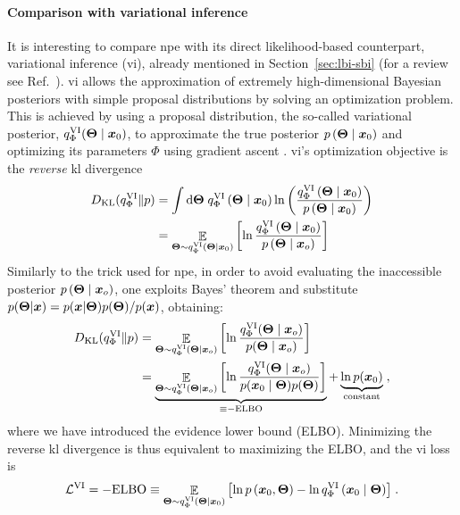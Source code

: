 \paragraph{Comparison with variational inference} 
It is interesting to compare \gls*{npe} with its direct likelihood-based counterpart, variational inference (\gls*{vi}), already mentioned in Section~\ref{sec:lbi-sbi} (for a review see Ref.~\cite{zhang2018advances}). \Gls*{vi} allows the approximation of extremely high-dimensional Bayesian posteriors with simple proposal distributions by solving an optimization problem. 
This is achieved by using a proposal distribution, the so-called variational posterior, $q^\text{VI}_\Phi(\bm{\Theta} \mid \bm{x}_0)$, to approximate the true posterior $p\left(\bm{\Theta} \mid \bm{x}_0\right)$ and optimizing its parameters $\Phi$ using gradient ascent \cite{Murphy:book, bottou:nips, kingma2014adam}. \Gls*{vi}'s optimization objective is the \emph{reverse} \gls*{kl} divergence
%
\begin{align} \label{eq:rkl}
	D_{\mathrm{KL}}(q^\text{VI}_\Phi \| p)  &= \int \dd \bm{\Theta}\; q^\text{VI}_\Phi\left(\bm{\Theta} \mid \bm{x}_0 \right) \ln \left(\frac{q^\text{VI}_\Phi\left(\bm{\Theta} \mid \bm{x}_0\right)}{p\left(\bm{\Theta} \mid \bm{x}_0\right)}\right) \\
	& =\mathop{\mathbb{E}}\limits_{\bm{\Theta} \sim q^\text{VI}_\Phi\left(\bm{\Theta} \mid \bm{x}_0\right)}\left[\ln \frac{q^\text{VI}_\Phi\left(\bm{\Theta} \mid \bm{x}_0\right)}{p\left(\bm{\Theta} \mid \bm{x}_o\right)}\right]
\end{align}
%
Similarly to the trick used for \gls*{npe}, in order to avoid evaluating the inaccessible posterior $p\left(\bm{\Theta} \mid \bm{x}_o\right)$, one exploits Bayes' theorem and substitute $p(\bm{\Theta}| \bm{x}) = p(\bm{x}| \bm{\Theta}) p(\bm{\Theta}) / p(\bm{x})$, obtaining:
%
\begin{align}
	D_{\mathrm{KL}}(q^\text{VI}_\Phi \| p) &=
	\mathop{\mathbb{E}}\limits_{\bm{\Theta} \sim q^\text{VI}_\Phi(\bm{\Theta} \mid \bm{x}_o)}\left[\ln \frac{q^\text{VI}_\Phi(\bm{\Theta} \mid \bm{x}_o)}{p(\bm{\Theta} \mid \bm{x}_o)}\right] \\
	& =\underbrace{\mathop{\mathbb{E}}\limits_{\bm{\Theta} \sim q^\text{VI}_\Phi(\bm{\Theta}\mid \bm{x}_o)}\left[\ln \frac{q^\text{VI}_\Phi(\bm{\Theta} \mid \bm{x}_o)}{p(\bm{x}_0 \mid \bm{\Theta}) p(\bm{\Theta})}\right]}_{\equiv-{\rm ELBO}}+ \underbrace{\ln p(\bm{x}_0)}_\text{constant} \;,
\end{align}
%
where we have introduced the evidence lower bound (ELBO). Minimizing the reverse \gls*{kl} divergence is thus equivalent to maximizing the ELBO, and the \gls*{vi} loss is
%
\begin{equation} \label{eq:lvi}
	\mathcal{L}^\text{VI} = -\mathrm{ELBO} \equiv {\mathop{\mathbb{E}}\limits_{\ensuremath{\bm{\Theta}}\sim q^\text{VI}_\Phi\left(\ensuremath{\bm{\Theta}}\mid \ensuremath{\bm{x}}_0\right)}\left[\ln p\left(\ensuremath{\bm{x}}_0, \ensuremath{\bm{\Theta}}\right)-\ln q^\text{VI}_\Phi\left(\ensuremath{\bm{x}}_0 \mid \ensuremath{\bm{\Theta}}\right)\right]} \;.
\end{equation}

